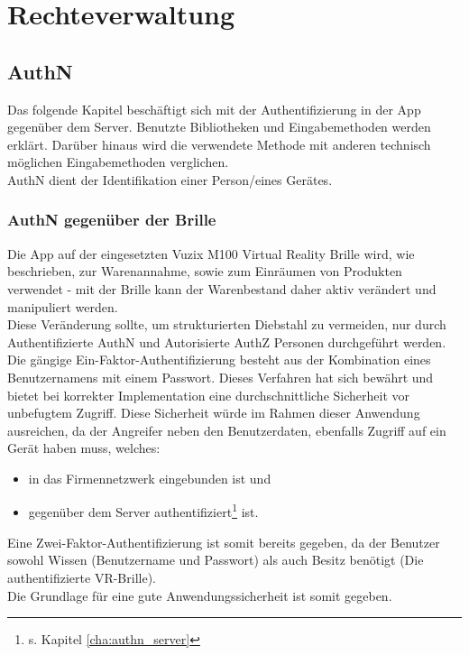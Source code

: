 \section{Rechteverwaltung}
\label{cha:rechteverwaltung_vr}

\subsection{\acf{AuthN}}
Das folgende Kapitel beschäftigt sich mit der Authentifizierung in der App gegenüber dem Server. Benutzte Bibliotheken und Eingabemethoden werden erklärt. Darüber hinaus wird die verwendete Methode mit anderen technisch möglichen Eingabemethoden verglichen.\\

\acl{AuthN} dient der Identifikation einer Person/eines Gerätes.

\subsubsection{\acs{AuthN} gegenüber der Brille}
Die App auf der eingesetzten Vuzix M100 Virtual Reality Brille wird, wie beschrieben, zur Warenannahme, sowie zum Einräumen von Produkten verwendet - mit der Brille kann der Warenbestand daher aktiv verändert und manipuliert werden.\\
Diese Veränderung sollte, um \zB strukturierten Diebstahl zu vermeiden, nur durch Authentifizierte \acs{AuthN} und Autorisierte \acs{AuthZ} Personen durchgeführt werden.\\

Die gängige Ein-Faktor-Authentifizierung besteht aus der Kombination eines Benutzernamens mit einem Passwort. Dieses Verfahren hat sich bewährt und bietet bei korrekter Implementation eine durchschnittliche Sicherheit vor unbefugtem Zugriff. Diese Sicherheit würde im Rahmen dieser Anwendung ausreichen, da der Angreifer neben den Benutzerdaten, ebenfalls Zugriff auf ein Gerät haben muss, welches:
\begin{itemize}
	\item in das Firmennetzwerk eingebunden ist und
	\item gegenüber dem Server authentifiziert\footnote{s. Kapitel \ref{cha:authn_server}} ist.
\end{itemize}
Eine Zwei-Faktor-Authentifizierung ist somit bereits gegeben, da der Benutzer sowohl Wissen (Benutzername und Passwort) als auch Besitz benötigt (Die authentifizierte \acl{VR}-Brille).\\
Die Grundlage für eine gute Anwendungssicherheit ist somit gegeben.

